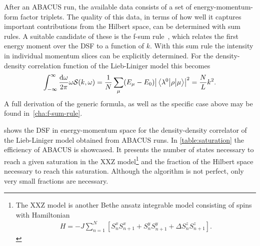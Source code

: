 \documentclass[11pt, a4paper]{report} %
\begin{document}
After an ABACUS run, the available data consists of a set of energy-momentum-form factor triplets.
The quality of this data, in terms of how well it captures important contributions from the Hilbert space, can be determined with sum rules.
A suitable candidate of these is the f-sum rule~\cite{Caux2007a}, which relates the first energy moment over the DSF to a function of \(k\).
With this sum rule the intensity in individual momentum slices can be explicitly determined.
For the density-density correlation function of the Lieb-Liniger model this becomes
\begin{align}
  \label{eq:fsumrule}
  \int_{-\infty}^{\infty} \frac{\dd \omega}{2\pi} \omega \mathcal{S}(k, \omega) = \frac{1}{N}\sum_{\mu}(E_{\mu}-E_0)\abs{\mel{\lambda^0}{\rho}{\mu}}^2  = \frac{N}{L} k^2.
\end{align}
A full derivation of the generic formula, as well as the specific case above may be found in~\cref{cha:f-sum-rule}. 

 shows the DSF in energy-momentum space for the density-density correlator of the Lieb-Liniger model obtained from ABACUS runs.
In \cref{table:saturation} the efficiency of ABACUS is showcased.
It presents the number of states necessary to reach a given saturation in the XXZ model\footnote{The XXZ model is another Bethe ansatz integrable model consisting of spins with Hamiltonian~\cite{Franchini2017}
    \begin{align}
      \label{eq:53}
      H = - J \sum_{n=1}^N\left[S_{n}^xS_{n+1}^x+S_n^yS_{n+1}^y + \Delta S_n^zS_{n+1}^z\right].
    \end{align}
} and the fraction of the Hilbert space necessary to reach this saturation.
Although the algorithm is not perfect, only very small fractions are necessary.
\end{document}
